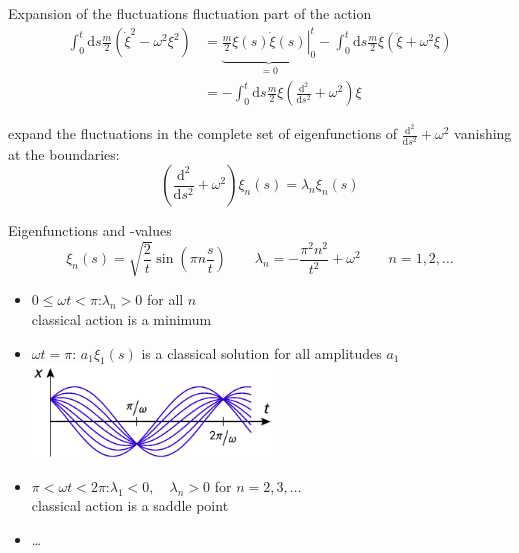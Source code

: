 \documentclass[t,dvipsnames]{beamer}
\begin{document}
\begin{frame}[c]{Expansion of the fluctuations}
 fluctuation part of the action
 \begin{displaymath}
  \begin{aligned}
   \int_0^t\text{d}s\frac{m}{2}\left(\dot\xi^2-\omega^2\xi^2\right)
 	&= \underbrace{\left.\frac{m}{2}\xi(s)\dot\xi(s)\right\vert_0^t}_{=0}
 	   -\int_0^t\text{d}s\frac{m}{2}\xi\left(\ddot\xi+\omega^2\xi\right)\\
	  &=-\int_0^t\text{d}s\frac{m}{2}\xi\left(\frac{\text{d}^2}{\text{d}s^2}+\omega^2\right)\xi
  \end{aligned}
 \end{displaymath}

 expand the fluctuations in the complete set of eigenfunctions of $\frac{\text{d}^2}{\text{d}s^2}+\omega^2$
 vanishing at the boundaries:
 \begin{displaymath}
  \left(\frac{\text{d}^2}{\text{d}s^2}+\omega^2\right)\xi_n(s) = \lambda_n\xi_n(s)
 \end{displaymath}
\end{frame}

\begin{frame}[c]{Eigenfunctions and -values}
 \begin{displaymath}
  \xi_n(s) = \sqrt{\frac{2}{t}}\sin\left(\pi n\frac{s}{t}\right)\qquad
  \lambda_n = -\frac{\pi^2n^2}{t^2}+\omega^2\qquad n=1, 2,\ldots
 \end{displaymath}

 \begin{itemize}
  \item $0\leq \omega t < \pi$:\quad $\lambda_n > 0$ for all $n$\\
	classical action is a minimum
  \item $\omega t=\pi$: $a_1\xi_1(s)$ is a classical solution for all amplitudes $a_1$\\
	\includegraphics[width=0.5\textwidth]{ho_classical}
  \item $\pi < \omega t < 2\pi$:\quad $\lambda_1 <0,\quad \lambda_n >0$ for $n=2, 3,\ldots$\\
	classical action is a saddle point
  \item \ldots
 \end{itemize}
\end{frame}
\end{document}
